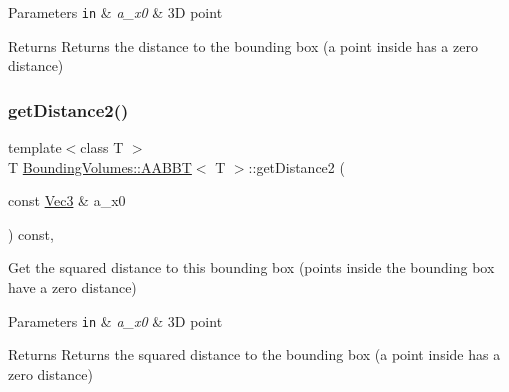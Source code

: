\begin{DoxyParams}[1]{Parameters}
\mbox{\tt in}  & {\em a\+\_\+x0} & 3D point \\
\hline
\end{DoxyParams}
\begin{DoxyReturn}{Returns}
Returns the distance to the bounding box (a point inside has a zero distance) 
\end{DoxyReturn}
\mbox{\label{classBoundingVolumes_1_1AABBT_a2196f1cf735ccf5d1f5c1ee8dcb449dd}} 
\subsubsection{\texorpdfstring{get\+Distance2()}{getDistance2()}}
{\footnotesize\ttfamily template$<$class T $>$ \\
T \hyperlink{classBoundingVolumes_1_1AABBT}{Bounding\+Volumes\+::\+A\+A\+B\+BT}$<$ T $>$\+::get\+Distance2 (\begin{DoxyParamCaption}\item[{const \hyperlink{classBoundingVolumes_1_1AABBT_aa968c6b21a7f02e1cbfc03d26c7e67b4}{Vec3} \&}]{a\+\_\+x0 }\end{DoxyParamCaption}) const\hspace{0.3cm}{\ttfamily [inline]}, {\ttfamily [noexcept]}}



Get the squared distance to this bounding box (points inside the bounding box have a zero distance) 


\begin{DoxyParams}[1]{Parameters}
\mbox{\tt in}  & {\em a\+\_\+x0} & 3D point \\
\hline
\end{DoxyParams}
\begin{DoxyReturn}{Returns}
Returns the squared distance to the bounding box (a point inside has a zero distance) 
\end{DoxyReturn}
\mbox{\label{classBoundingVolumes_1_1AABBT_ae65563ac6f3851f8fb05e0c98613fc0d}} 
